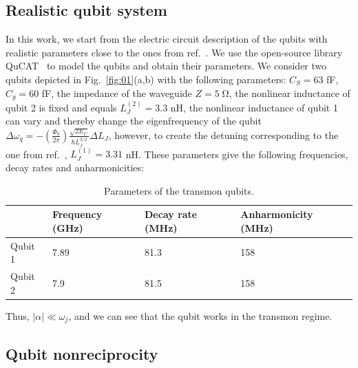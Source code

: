 \documentclass[lettersize,journal]{IEEEtran}
\begin{document}
\subsection{Realistic qubit system}

In this work, we start from the electric circuit description of the qubits with realistic parameters close to the ones from ref.~\cite{rosario_hamann_nonreciprocity_2018}.
We use the open-source library QuCAT~\cite{gely_qucat_2020} to model the qubits and obtain their parameters.
We consider two qubits depicted in Fig.~\ref{fig:01}(a,b) with the following parameters: $C_S = 63$ fF, $C_g = 60$ fF, the impedance of the waveguide $Z = 5 \; \mathrm{\Omega}$, the nonlinear inductance of qubit 2 is fixed and equals $L_J^{(2)} = 3.3$ nH, the nonlinear inductance of qubit 1 can vary and thereby change the eigenfrequency of the qubit $\Delta \omega_q = - \left( \frac{\Phi_0}{2 \pi} \right) \frac{\sqrt{2 E_C}}{\hbar L_J^{3/2}} \Delta L_J$, however, to create the detuning corresponding to the one from ref.~\cite{rosario_hamann_nonreciprocity_2018}, $L_J^{(1)} = 3.31$ nH.
These parameters give the following frequencies, decay rates and anharmonicities:
\begin{table}[h!]
\centering
\caption{Parameters of the transmon qubits.}
\begin{tabular}{||m{1cm} m{1.6cm} m{1.6cm} m{1.6cm}||} 
 \hline
 & Frequency (GHz) & Decay rate (MHz) & Anharmonicity (MHz) \\
 \hline\hline
 Qubit 1 & 7.89 & 81.3 & 158 \\
 \hline
 Qubit 2 & 7.9 & 81.5 & 158 \\
 \hline
\end{tabular}
\label{tab:01}
\end{table}
Thus, $|\alpha| \ll \omega_j$, and we can see that the qubit works in the transmon regime.

\subsection{Qubit nonreciprocity}
\end{document}
